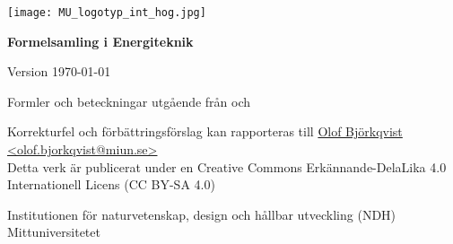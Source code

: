 \begin{titlepage}
    \begin{center}
        \texttt{[image: MU\_logotyp\_int\_hog.jpg]}
        \vspace*{4cm}
            
        \Huge
        \textbf{Formelsamling i Energiteknik} \par
            
        \Large
        \renewcommand{\dateseparator}{-}
        Version \today ~\currenttime
            
        \vspace{2,5cm}
            
            
        
        \vfill
            
		\normalsize
		Formler och beteckningar utgående från \cite{soleimani_mohseni_formelsamling_2018} och \cite{alvarez_energiteknik_2006} \par
		\tiny
		Korrekturfel och förbättringsförslag kan rapporteras till \href{mailto:olof.bjorkqvist@miun.se}{Olof Björkqvist <olof.bjorkqvist@miun.se>} \\
		Detta verk är publicerat under en Creative Commons Erkännande-DelaLika 4.0 Internationell Licens  (CC BY-SA 4.0)

            
        \Large
        Institutionen för naturvetenskap, design och hållbar utveckling (NDH)\\
        Mittuniversitetet\\
            
    \end{center}
\end{titlepage}
